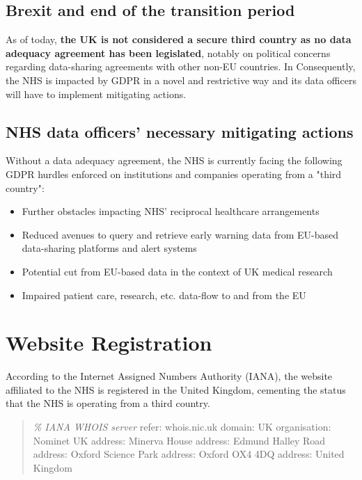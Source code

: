 \documentclass[twocolumn, letterpaper,13pt]{scrartcl}
\begin{document}
	    \subsection{Brexit and end of the transition period}
	    As of today, \textbf{the UK is not considered a secure third country as no data adequacy agreement has been legislated}, notably on political concerns regarding data-sharing agreements with other non-EU countries\cite{USagreement}. In Consequently, the NHS is impacted by GDPR in a novel and restrictive way and its data officers will have to implement mitigating actions.
	    
	    \subsection{NHS data officers' necessary mitigating actions}
	    
	    Without a data adequacy agreement, the NHS is currently facing the following GDPR hurdles\cite{dataAdequacyAndBrexit} enforced on institutions and companies operating from a "third country":
	    \begin{itemize}
	        \item Further obstacles impacting NHS' reciprocal healthcare arrangements
	        \item Reduced avenues to query and retrieve early warning data from EU-based data-sharing platforms and alert systems
	        \item Potential cut from EU-based data in the context of UK medical research
	        \item Impaired patient care, research, etc. data-flow to and from the EU
	    \end{itemize}
	    
	\section{Website Registration}
	
	    According to the Internet Assigned Numbers Authority (IANA)\cite{iana}, the website affiliated to the NHS is registered in the United Kingdom, cementing the status that the NHS is operating from a third country.
	    
	   \begin{quote}\textit{\% IANA WHOIS server}\newline
        refer:        whois.nic.uk\newline
        domain:       UK\newline
        organisation: Nominet UK\newline
        address:      Minerva House\newline
        address:      Edmund Halley Road\newline
        address:      Oxford Science Park\newline
        address:      Oxford  OX4 4DQ\newline
        address:      United Kingdom
        \end{quote}
	    
\end{document}
